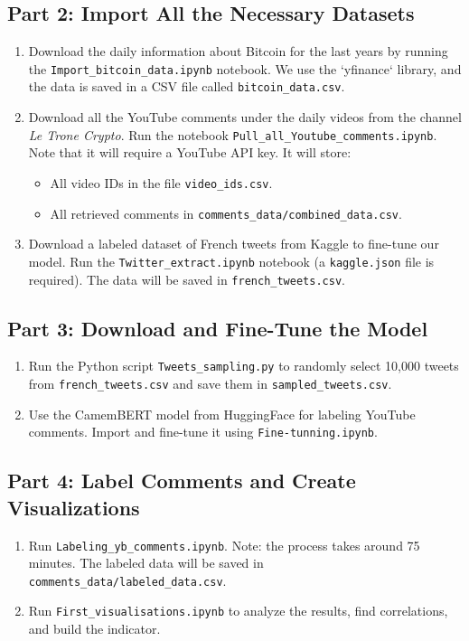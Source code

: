 \documentclass[12pt,a4paper]{article}
\begin{document}
\subsection*{Part 2: Import All the Necessary Datasets}
\begin{enumerate}[label=Step \arabic*:, start=2]
    \item Download the daily information about Bitcoin for the last years by running the \texttt{Import\_bitcoin\_data.ipynb} notebook. We use the `yfinance` library, and the data is saved in a CSV file called \texttt{bitcoin\_data.csv}.
    \item Download all the YouTube comments under the daily videos from the channel \textit{Le Trone Crypto}. Run the notebook \texttt{Pull\_all\_Youtube\_comments.ipynb}. Note that it will require a YouTube API key. It will store:
    \begin{itemize}
        \item All video IDs in the file \texttt{video\_ids.csv}.
        \item All retrieved comments in \texttt{comments\_data/combined\_data.csv}.
    \end{itemize}
    \item Download a labeled dataset of French tweets from Kaggle to fine-tune our model. Run the \texttt{Twitter\_extract.ipynb} notebook (a \texttt{kaggle.json} file is required). The data will be saved in \texttt{french\_tweets.csv}.
\end{enumerate}

\subsection*{Part 3: Download and Fine-Tune the Model}
\begin{enumerate}[label=Step \arabic*:, start=5]
    \item Run the Python script \texttt{Tweets\_sampling.py} to randomly select 10,000 tweets from \texttt{french\_tweets.csv} and save them in \texttt{sampled\_tweets.csv}.
    \item Use the CamemBERT model from HuggingFace for labeling YouTube comments. Import and fine-tune it using \texttt{Fine-tunning.ipynb}.
\end{enumerate}

\subsection*{Part 4: Label Comments and Create Visualizations}
\begin{enumerate}[label=Step \arabic*:, start=7]
    \item Run \texttt{Labeling\_yb\_comments.ipynb}. Note: the process takes around 75 minutes. The labeled data will be saved in \texttt{comments\_data/labeled\_data.csv}.
    \item Run \texttt{First\_visualisations.ipynb} to analyze the results, find correlations, and build the indicator.
\end{enumerate}
\end{document}
